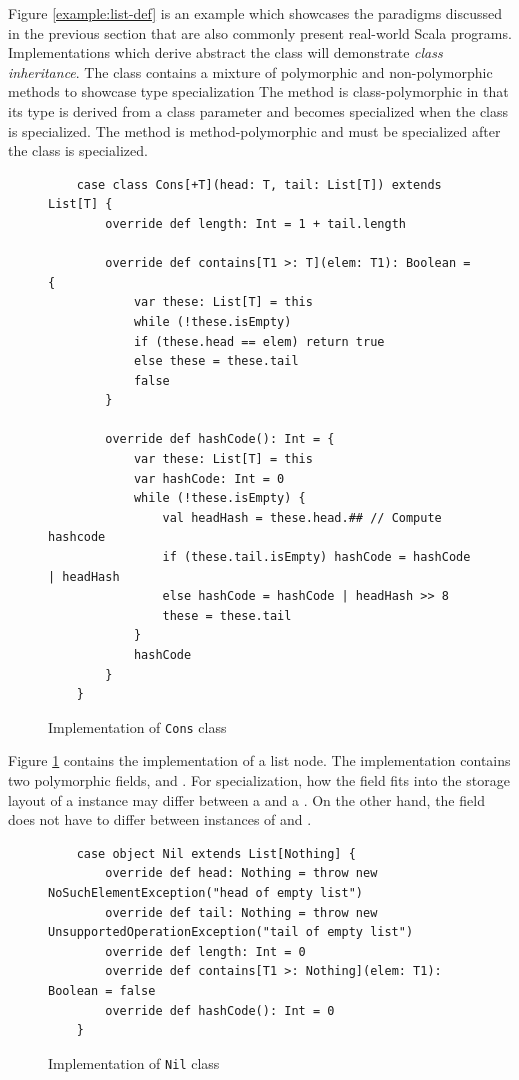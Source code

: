 Figure \ref{example:list-def} is an example which showcases the paradigms discussed in the previous section that are also commonly present real-world Scala programs.
Implementations which derive abstract the  class will demonstrate \textit{class inheritance}.
The  class contains a mixture of polymorphic and non-polymorphic methods to showcase type specialization
The  method is class-polymorphic in that its type is derived from a class parameter and becomes specialized when the class is specialized.
The  method is method-polymorphic and must be specialized after the class is specialized.

\begin{figure}[!htb]
	\begin{verbatim}
	case class Cons[+T](head: T, tail: List[T]) extends List[T] {
		override def length: Int = 1 + tail.length
		
		override def contains[T1 >: T](elem: T1): Boolean = {
			var these: List[T] = this
			while (!these.isEmpty) 
			if (these.head == elem) return true
			else these = these.tail
			false
		}
			
		override def hashCode(): Int = {
			var these: List[T] = this
			var hashCode: Int = 0
			while (!these.isEmpty) {
				val headHash = these.head.## // Compute hashcode
				if (these.tail.isEmpty) hashCode = hashCode | headHash
				else hashCode = hashCode | headHash >> 8
				these = these.tail
			}
			hashCode
		}
	}
	\end{verbatim}
	\caption{Implementation of \texttt{Cons} class}
	\label{example:cons-impl}
\end{figure}

Figure \ref{example:cons-impl} contains the implementation of a list node.
The  implementation contains two polymorphic fields,  and .
For specialization, how the  field fits into the storage layout of a  instance may differ between a  and a .
On the other hand, the  field does not have to differ between instances of  and .

\begin{figure}[!htb]
	\begin{verbatim}
	case object Nil extends List[Nothing] {
		override def head: Nothing = throw new NoSuchElementException("head of empty list")
		override def tail: Nothing = throw new UnsupportedOperationException("tail of empty list")
		override def length: Int = 0
		override def contains[T1 >: Nothing](elem: T1): Boolean = false
		override def hashCode(): Int = 0
	}
	\end{verbatim}
	\caption{Implementation of \texttt{Nil} class}
	\label{example:nil-impl}
\end{figure}

